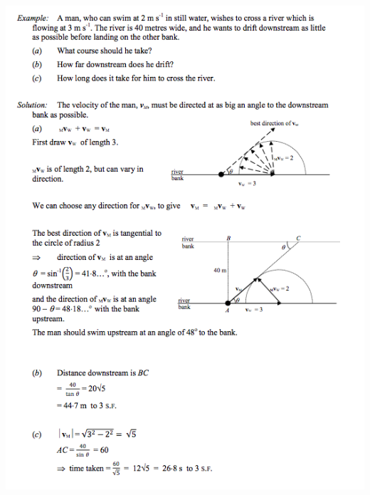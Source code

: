 \documentclass[a4paper]{article}
\begin{document}
\begin{center}
    \includegraphics[scale=0.5]{img_M/15_eg3}
\end{center}
\end{document}
